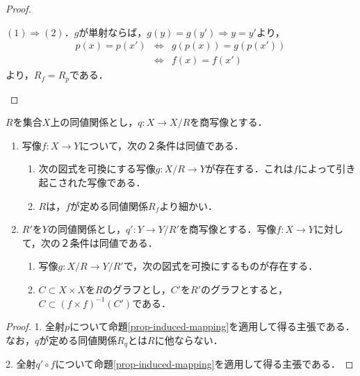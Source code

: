 \documentclass[uplatex,dvipdfmx]{jsreport}
\begin{document}
\begin{proof}
\begin{description}
        $(1)\Rightarrow(2)$．$g$が単射ならば，$g(y)=g(y')\Rightarrow y=y'$より，
        \begin{eqnarray*}
            p(x)=p(x') &\Leftrightarrow& g(p(x))=g(p(x')) \\
            &\Leftrightarrow& f(x)=f(x')
        \end{eqnarray*}
        より，$R_f=R_p$である．
    \end{description}
\end{proof}

\begin{corollary}[商集合の普遍性]
    $R$を集合$X$上の同値関係とし，$q:X\to X/R$を商写像とする．
    \begin{enumerate}
        \item 写像$f:X\to Y$について，次の２条件は同値である．
        \begin{enumerate}[(1)]
            \item 次の図式を可換にする写像$g:X/R\to Y$が存在する．これは$f$によって引き起こされた写像である．\begin{center}\end{center}
            \item $R$は，$f$が定める同値関係$R_f$より細かい．
        \end{enumerate}
        \item $R'$を$Y$の同値関係とし，$q':Y\to Y/R'$を商写像とする．写像$f:X\to Y$に対して，次の２条件は同値である．
        \begin{enumerate}[(1)]
            \item 写像$g:X/R\to Y/R'$で，次の図式を可換にするものが存在する．
            \begin{center}\end{center}
            \item $C\subset X\times X$を$R$のグラフとし，$C'$を$R'$のグラフとすると，$C\subset (f\times f)^{-1}(C')$である．
        \end{enumerate}
    \end{enumerate}
\end{corollary}
\begin{proof}
    1. 全射$p$について命題\ref{prop-induced-mapping}を適用して得る主張である．なお，$q$が定める同値関係$R_q$とは$R$に他ならない．
    
    2. 全射$q'\circ f$について命題\ref{prop-induced-mapping}を適用して得る主張である．
\end{proof}
\end{document}
